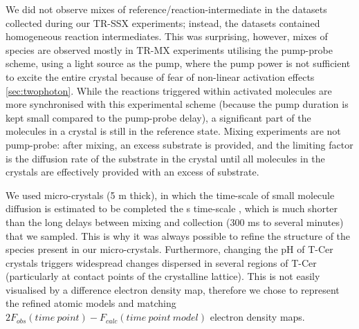 We did not observe mixes of reference/reaction-intermediate in the datasets collected during our TR-SSX experiments; instead, the datasets contained homogeneous reaction intermediates. This was surprising, however, mixes of species are observed mostly in TR-MX experiments utilising the pump-probe scheme, using a light source as the pump, where the pump power is not sufficient to excite the entire crystal because of fear of non-linear activation effects \ref{sec:twophoton}. While the reactions triggered within activated molecules are more synchronised with this experimental scheme (because the pump duration is kept small compared to the pump-probe delay), a significant part of the molecules in a crystal is still in the reference state. Mixing experiments are not pump-probe: after mixing, an excess substrate is provided, and the limiting factor is the diffusion rate of the substrate in the crystal until all molecules in the crystals are effectively provided with an excess of substrate.

We used micro-crystals (5 \textmu m thick), in which the time-scale of small molecule diffusion is estimated to be completed the \textmu s time-scale \parencite{schmidtMixInjectReaction2013, olmosEnzymeIntermediatesCaptured2018}, which is much shorter than the long delays between mixing and collection (300 ms to several minutes) that we sampled. This is why it was always possible to refine the structure of the species present in our micro-crystals. Furthermore, changing the pH of T-Cer crystals triggers widespread changes dispersed in several regions of T-Cer (particularly at contact points of the crystalline lattice). This is not easily visualised by a difference electron density map, therefore we chose to represent the refined atomic models and matching \(2F_{obs}(time\ point) - F_{calc}(time\ point\ model)\) electron density maps. 


